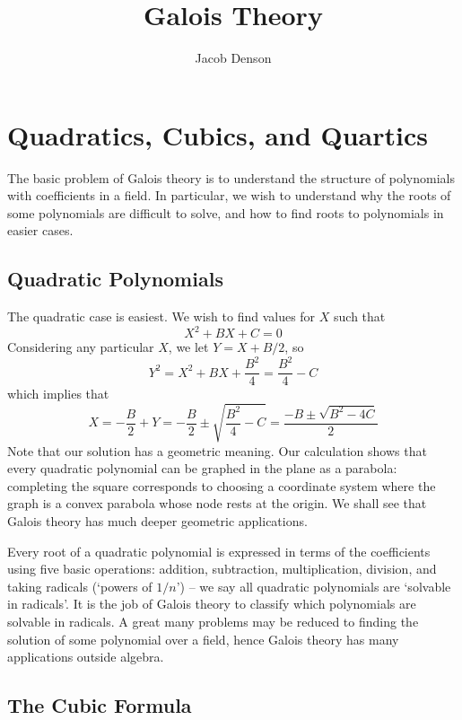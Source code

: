 

\title{Galois Theory}
\author{Jacob Denson}



\maketitle
\tableofcontents

\chapter{Quadratics, Cubics, and Quartics}


The basic problem of Galois theory is to understand the structure of polynomials with coefficients in a field. In particular, we wish to understand why the roots of some polynomials are difficult to solve, and how to find roots to polynomials in easier cases.

\section{Quadratic Polynomials}

The quadratic case is easiest. We wish to find values for $X$ such that
%
\[ X^2 + BX + C  = 0 \]
%
Considering any particular $X$, we let $Y = X + B/2$, so
%
\[ Y^2 = X^2 + BX + \frac{B^2}{4} = \frac{B^2}{4} - C \]
%
which implies that
%
\[ X = -\frac{B}{2} + Y = -\frac{B}{2} \pm \sqrt{\frac{B^2}{4} - C} = \frac{-B \pm \sqrt{B^2 - 4C}}{2} \]
%
Note that our solution has a geometric meaning. Our calculation shows that every quadratic polynomial can be graphed in the plane as a parabola: completing the square corresponds to choosing a coordinate system where the graph is a convex parabola whose node rests at the origin. We shall see that Galois theory has much deeper geometric applications.

Every root of a quadratic polynomial is expressed in terms of the coefficients using five basic operations: addition, subtraction, multiplication, division, and taking radicals (`powers of $1/n$') -- we say all quadratic polynomials are `solvable in radicals'. It is the job of Galois theory to classify which polynomials are solvable in radicals. A great many problems may be reduced to finding the solution of some polynomial over a field, hence Galois theory has many applications outside algebra.

\section{The Cubic Formula}

